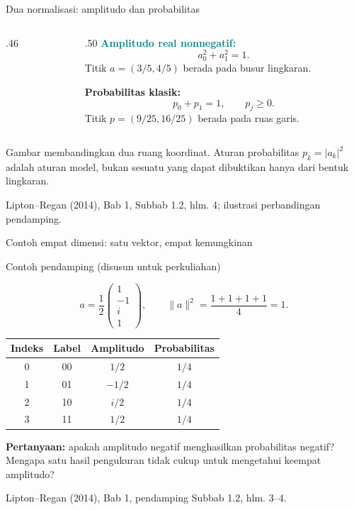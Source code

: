 \documentclass[aspectratio=169,11pt]{beamer}
\newcommand{\bookref}[1]{\par\vfill{\scriptsize\color{gray}Lipton--Regan (2014), Bab 1, #1.}}
\newcommand{\extra}{\par\textcolor{AcademicBlue}{\small Contoh pendamping (disusun untuk perkuliahan)}\par}
\begin{document}
\begin{frame}{Dua normalisasi: amplitudo dan probabilitas}
\setlength{\abovedisplayskip}{5pt}\setlength{\belowdisplayskip}{5pt}

\begin{columns}[c]
\begin{column}{.46\textwidth}
\centering
{}
\end{column}
\begin{column}{.50\textwidth}
\textcolor{teal}{\textbf{Amplitudo real nonnegatif:}}
\[
 a_0^2+a_1^2=1.
\]
Titik $a=(3/5,4/5)$ berada pada busur lingkaran.
\par\medskip
\textcolor{amber}{\textbf{Probabilitas klasik:}}
\[
 p_0+p_1=1,\qquad p_j\geq0.
\]
Titik $p=(9/25,16/25)$ berada pada ruas garis.
\end{column}
\end{columns}
\small
Gambar membandingkan dua ruang koordinat. Aturan probabilitas $p_k=|a_k|^2$ adalah aturan model, bukan sesuatu yang dapat dibuktikan hanya dari bentuk lingkaran.
\bookref{Subbab 1.2, hlm. 4; ilustrasi perbandingan pendamping}

\end{frame}

\begin{frame}{Contoh empat dimensi: satu vektor, empat kemungkinan}
\small

\extra
\[
 a=\frac12\begin{pmatrix}1\\-1\\i\\1\end{pmatrix},\qquad
 \|a\|^2=\frac{1+1+1+1}{4}=1.
\]
\begin{center}
\begin{tabular}{cccc}\toprule
Indeks & Label & Amplitudo & Probabilitas\\\midrule
0 & 00 & $1/2$ & $1/4$\\
1 & 01 & $-1/2$ & $1/4$\\
2 & 10 & $i/2$ & $1/4$\\
3 & 11 & $1/2$ & $1/4$\\\bottomrule
\end{tabular}
\end{center}
\textbf{Pertanyaan:} apakah amplitudo negatif menghasilkan probabilitas negatif? Mengapa satu hasil pengukuran tidak cukup untuk mengetahui keempat amplitudo?
\bookref{pendamping Subbab 1.2, hlm. 3--4}

\end{frame}
\end{document}
